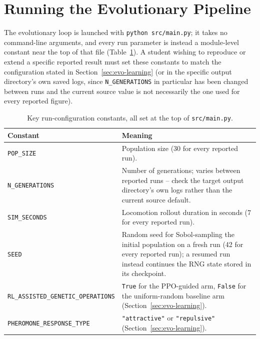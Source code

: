 \documentclass[12pt,a4paper]{report}
\begin{document}
\section{Running the Evolutionary Pipeline}
\label{app:running}
The evolutionary loop is launched with \texttt{python src/main.py}; it takes no command-line arguments, and every run parameter is instead a module-level constant near the top of that file (Table~\ref{tab:run-config}). A student wishing to reproduce or extend a specific reported result must set these constants to match the configuration stated in Section~\ref{sec:evo-learning} (or in the specific output directory's own saved logs, since \texttt{N\_GENERATIONS} in particular has been changed between runs and the current source value is not necessarily the one used for every reported figure).

\begin{table}[htbp]
\centering
\footnotesize
\caption{Key run-configuration constants, all set at the top of \texttt{src/main.py}.}
\label{tab:run-config}
\begin{tabular}{@{}p{5.2cm}p{8.4cm}@{}}
\toprule
\textbf{Constant} & \textbf{Meaning} \\
\midrule
\texttt{POP\_SIZE} & Population size (30 for every reported run). \\
\texttt{N\_GENERATIONS} & Number of generations; varies between reported runs -- check the target output directory's own logs rather than the current source default. \\
\texttt{SIM\_SECONDS} & Locomotion rollout duration in seconds (7 for every reported run). \\
\texttt{SEED} & Random seed for Sobol-sampling the initial population on a fresh run (42 for every reported run); a resumed run instead continues the RNG state stored in its checkpoint. \\
\texttt{RL\_ASSISTED\_GENETIC\_OPERATIONS} & \texttt{True} for the PPO-guided arm, \texttt{False} for the uniform-random baseline arm (Section~\ref{sec:evo-learning}). \\
\texttt{PHEROMONE\_RESPONSE\_TYPE} & \texttt{"attractive"} or \texttt{"repulsive"} (Section~\ref{sec:evo-learning}). \\
\bottomrule
\end{tabular}
\end{table}
\end{document}
